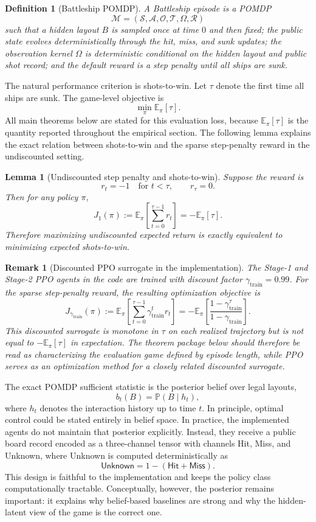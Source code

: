 \documentclass[11pt]{article}
\newtheorem{definition}{Definition}
\newtheorem{lemma}{Lemma}
\newtheorem{remark}{Remark}
\newcommand{\A}{\mathcal{A}}
\newcommand{\Sset}{\mathcal{S}}
\newcommand{\Oset}{\mathcal{O}}
\newcommand{\T}{\mathcal{T}}
\newcommand{\R}{\mathcal{R}}
\newcommand{\E}{\mathbb{E}}
\newcommand{\Prob}{\mathbb{P}}
\newcommand{\tauT}{\tau}
\newcommand{\gammaTrain}{\gamma_{\mathrm{train}}}
\begin{document}
\begin{definition}[Battleship POMDP]
A Battleship episode is a POMDP
\[
\mathcal{M}=(\Sset,\A,\Oset,\T,\Omega,\R)
\]
such that a hidden layout $B$ is sampled once at time $0$ and then fixed; the public state evolves deterministically through the hit, miss, and sunk updates; the observation kernel $\Omega$ is deterministic conditional on the hidden layout and public shot record; and the default reward is a step penalty until all ships are sunk.
\end{definition}

The natural performance criterion is shots-to-win. Let $\tauT$ denote the first time all ships are sunk. The game-level objective is
\[
\min_{\pi}\E_{\pi}[\tauT].
\]
All main theorems below are stated for this evaluation loss, because $\E_{\pi}[\tauT]$ is the quantity reported throughout the empirical section. The following lemma explains the exact relation between shots-to-win and the sparse step-penalty reward in the undiscounted setting.

\begin{lemma}[Undiscounted step penalty and shots-to-win]
Suppose the reward is
\[
r_t=-1 \quad \text{for } t<\tauT, \qquad r_{\tauT}=0.
\]
Then for any policy $\pi$,
\[
J_1(\pi):=\E_{\pi}\left[\sum_{t=0}^{\tauT-1}r_t\right] = -\E_{\pi}[\tauT].
\]
Therefore maximizing undiscounted expected return is exactly equivalent to minimizing expected shots-to-win.
\end{lemma}

\begin{remark}[Discounted PPO surrogate in the implementation]
The Stage-1 and Stage-2 PPO agents in the code are trained with discount factor $\gammaTrain=0.99$. For the sparse step-penalty reward, the resulting optimization objective is
\[
J_{\gammaTrain}(\pi)
:=
\E_{\pi}\left[\sum_{t=0}^{\tauT-1}\gammaTrain^t r_t\right]
=
-\E_{\pi}\left[\frac{1-\gammaTrain^{\tauT}}{1-\gammaTrain}\right].
\]
This discounted surrogate is monotone in $\tauT$ on each realized trajectory but is not equal to $-\E_{\pi}[\tauT]$ in expectation. The theorem package below should therefore be read as characterizing the evaluation game defined by episode length, while PPO serves as an optimization method for a closely related discounted surrogate.
\end{remark}

The exact POMDP sufficient statistic is the posterior belief over legal layouts,
\[
b_t(B)=\Prob(B\mid h_t),
\]
where $h_t$ denotes the interaction history up to time $t$. In principle, optimal control could be stated entirely in belief space. In practice, the implemented agents do not maintain that posterior explicitly. Instead, they receive a public board record encoded as a three-channel tensor with channels Hit, Miss, and Unknown, where Unknown is computed deterministically as
\[
\textsf{Unknown}=1-(\textsf{Hit}+\textsf{Miss}).
\]
This design is faithful to the implementation and keeps the policy class computationally tractable. Conceptually, however, the posterior remains important: it explains why belief-based baselines are strong and why the hidden-latent view of the game is the correct one.
\end{document}
